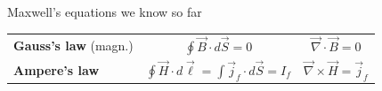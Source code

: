 \begin{frame}{Maxwell's equations we know so far}
{\begin{center}
{\begin{table}[H]
\begin{tabular}{|l|c|c|}
      {\bf Gauss's law} (magn.) &
        $\displaystyle \oint \vec{B} \cdot d\vec{S} = 0$ &
        $\displaystyle \vec{\nabla} \cdot \vec{B} = 0$ \\

      {\bf Ampere's law} &
        $\displaystyle \oint \vec{H} \cdot d\vec{\ell} =  \int \vec{j}_{f} \cdot d\vec{S} = I_{f}$ &
        $\displaystyle \vec{\nabla} \times \vec{H} = \vec{j}_{f}$ \\
      \hline
    \end{tabular}
  \end{table}
}
\end{center}

}

\end{frame}

%
%
%

